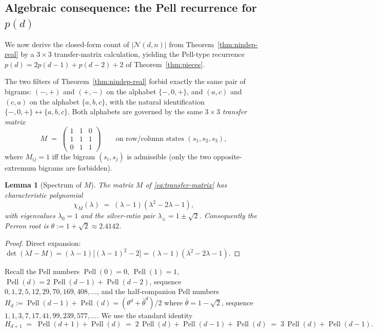 \documentclass{amsart}
\newtheorem{lemma}[theorem]{Lemma}
\theoremstyle{definition}
\theoremstyle{remark}
\DeclareMathOperator{\Pell}{Pell}
\begin{document}
\subsection{Algebraic consequence: the Pell recurrence for $p(d)$}
\label{sec:pell}

We now derive the closed-form count of $|\mathcal{N}(d, n)|$ from
Theorem~\ref{thm:nindep-real} by a $3 \times 3$ transfer-matrix
calculation, yielding the Pell-type recurrence
$p(d) = 2 p(d{-}1) + p(d{-}2) + 2$
of Theorem~\ref{thm:pieces}.

The two filters of Theorem~\ref{thm:nindep-real} forbid exactly
the same pair of bigrams: $(-, +)$ and $(+, -)$ on the alphabet
$\{-, 0, +\}$, and $(a, c)$ and $(c, a)$ on the alphabet
$\{a, b, c\}$, with the natural identification
$\{-, 0, +\} \leftrightarrow \{a, b, c\}$.  Both alphabets are
governed by the same $3 \times 3$ \emph{transfer matrix}
\begin{equation}\label{eq:transfer-matrix}
  M \;=\;
  \begin{pmatrix}
    1 & 1 & 0 \\
    1 & 1 & 1 \\
    0 & 1 & 1
  \end{pmatrix}
  \qquad \text{on row/column states } (s_1, s_2, s_3),
\end{equation}
where $M_{ij} = 1$ iff the bigram $(s_i, s_j)$ is admissible
(only the two opposite-extremum bigrams are forbidden).

\begin{lemma}[Spectrum of $M$]\label{lem:spectrum}
The matrix $M$ of \eqref{eq:transfer-matrix} has characteristic
polynomial
\[
  \chi_M(\lambda) \;=\; (\lambda - 1)(\lambda^2 - 2\lambda - 1),
\]
with eigenvalues $\lambda_0 = 1$ and the silver-ratio pair
$\lambda_\pm = 1 \pm \sqrt 2$.  Consequently the Perron root is
$\theta := 1 + \sqrt 2 \approx 2.4142$.
\end{lemma}

\begin{proof}
Direct expansion: $\det(\lambda I - M) = (\lambda - 1)\bigl[(\lambda
- 1)^2 - 2\bigr] = (\lambda - 1)(\lambda^2 - 2\lambda - 1)$.
\end{proof}

Recall the Pell numbers $\Pell(0) = 0$, $\Pell(1) = 1$,
$\Pell(d) = 2\,\Pell(d{-}1) + \Pell(d{-}2)$, sequence
$0, 1, 2, 5, 12, 29, 70, 169, 408, \ldots$, and the half-companion
Pell numbers $H_d := \Pell(d{-}1) + \Pell(d) = (\theta^d
+ \bar\theta^d)/2$ where $\bar\theta = 1 - \sqrt 2$, sequence
$1, 1, 3, 7, 17, 41, 99, 239, 577, \ldots$.  We use the standard
identity
\begin{equation}\label{eq:Hd-identity}
  H_{d+1} \;=\; \Pell(d+1) + \Pell(d)
              \;=\; 2\,\Pell(d) + \Pell(d-1) + \Pell(d)
              \;=\; 3\,\Pell(d) + \Pell(d-1).
\end{equation}
\end{document}
